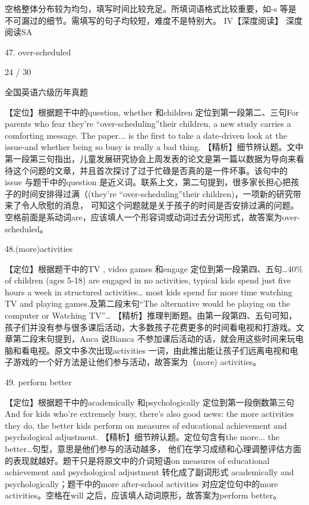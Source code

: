\documentclass[UTF8,11pt]{ctexart}
\begin{document}
空格整体分布较为均匀，填写时间比较充足。所填词语格式比较重要，如-s 等是不可漏过的细节。需填写的句子均较短，难度不是特别大。 IV【深度阅读】 深度阅读SA


47. over-scheduled


24 / 30


全国英语六级历年真题


【定位】根据题干中的question, whether 和children 定位到第一段第二、三句For parents who fear they're “over-scheduling”their children, a new study carries a comforting message. The paper... is the first to take a date-driven look at the issue-and whether being so busy is really a bad thing. 【精析】细节辨认题。文中第一段第三句指出，儿童发展研究协会上周发表的论文是第一篇以数据为导向来看待这个问题的文章，并且首次探讨了过于忙碌是否真的是一件坏事。该句中的issue 与题干中的question 是近义词。联系上文，第二句提到，很多家长担心把孩子的时间安排得过满（(they're “over-scheduling”their children)，一项新的研究带来了令人欣慰的消息， 可知这个问题就是关于孩子的时间是否安排过满的问题。空格前面是系动词are，应该填人一个形容词或动词过去分词形式，故答案为over-scheduled。


48.(more)activities


【定位】根据题干中的TV , video games 和engage 定位到第一段第四、五句…40\% of children (ages 5-18) are engaged in no activities, typical kids spend just five hours a week in structured activities… most kids spend far more time watching TV and playing games.及第二段末句“The alternative would be playing on the computer or Watching TV”… 【精析】推理判断题。由第一段第四、五句可知，孩子们并没有参与很多课后活动，大多数孩子花费更多的时间看电视和打游戏。文章第二段末句提到，Anca 说Bianca 不参加课后活动的话，就会用这些时间来玩电脑和看电视。原文中多次出现activities 一词，由此推出能让孩子们远离电视和电子游戏的一个好方法是让他们参与活动，故答案为（more) activities。


49. perform better


【定位】根据题干中的academically 和psychologically 定位到第一段倒数第三句And for kids who're extremely busy, there's also good news: the more activities they do, the better kids perform on measures of educational achievement and psychological adjustment. 【精析】细节辨认题。定位句含有the more... the better…句型，意思是他们参与的活动越多， 他们在学习成绩和心理调整评估方面的表现就越好。题干只是将原文中的介词短语on measures of educational achievement and psychological adjustment 转化成了副词形式 academically and psychologically；题干中的more after-school activities 对应定位句中的more activities。空格在will 之后，应该填人动词原形，故答案为perform better。
\end{document}

